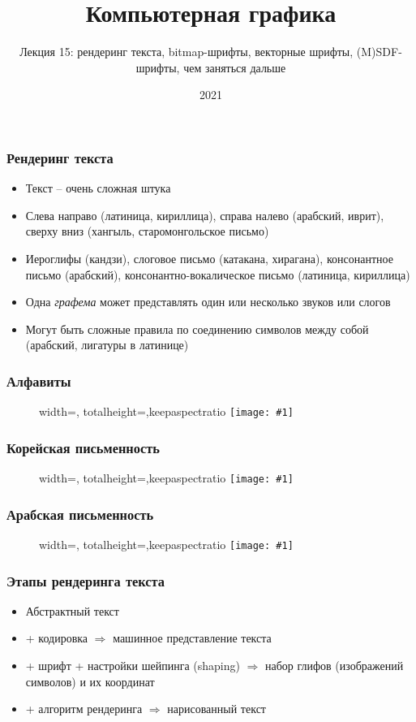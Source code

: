 \documentclass{beamer}
\title{Компьютерная графика}
\subtitle{Лекция 15: рендеринг текста, bitmap-шрифты, векторные шрифты, (M)SDF-шрифты, чем заняться дальше}
\date{2021}
\newcommand{\slideimage}[1]{
  \begin{figure}
    \begin{adjustbox}{width=\textwidth, totalheight=\textheight-2\baselineskip-2\baselineskip,keepaspectratio}
      \texttt{[image: \#1]}
    \end{adjustbox}
  \end{figure}
}
\begin{document}
\frame{\titlepage}

\begin{frame}[fragile]
\frametitle{Рендеринг текста}
\begin{itemize}
\item Текст -- очень сложная штука
\pause
\item Слева направо (латиница, кириллица), справа налево (арабский, иврит), сверху вниз (хангыль, старомонгольское письмо)
\pause
\item Иероглифы (кандзи), слоговое письмо (катакана, хирагана), консонантное письмо (арабский), консонантно-вокалическое письмо (латиница, кириллица)
\pause
\item Одна \textit{графема} может представлять один или несколько звуков или слогов
\pause
\item Могут быть сложные правила по соединению символов между собой (арабский, лигатуры в латинице)
\end{itemize}
\end{frame}

\begin{frame}[fragile]
\frametitle{Алфавиты}
\slideimage{alphabet.jpg}
\end{frame}

\begin{frame}[fragile]
\frametitle{Корейская письменность}
\slideimage{korean.png}
\end{frame}

\begin{frame}[fragile]
\frametitle{Арабская письменность}
\slideimage{arabic.png}
\end{frame}

\begin{frame}[fragile]
\frametitle{Этапы рендеринга текста}
\begin{itemize}
\item Абстрактный текст
\pause
\item + кодировка \begin{math}\Rightarrow\end{math} машинное представление текста
\pause
\item + шрифт + настройки шейпинга (shaping) \begin{math}\Rightarrow\end{math} набор глифов (изображений символов) и их координат
\pause
\item + алгоритм рендеринга \begin{math}\Rightarrow\end{math} нарисованный текст
\end{itemize}
\end{frame}
\end{document}
